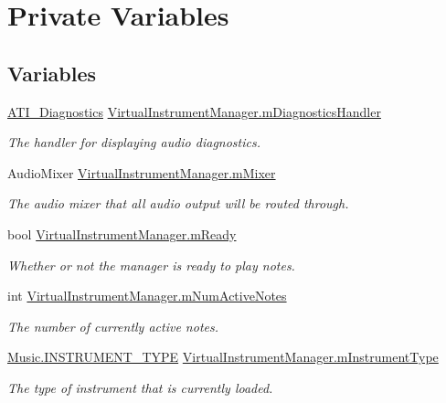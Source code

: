 \hypertarget{group___v_i_m_priv}{}\section{Private Variables}
\label{group___v_i_m_priv}
\subsection*{Variables}
\begin{DoxyCompactItemize}
\item 
\hyperlink{group___audio_testing_class_a_t_i___diagnostics}{A\+T\+I\+\_\+\+Diagnostics} \hyperlink{group___v_i_m_priv_gafabe4a874fc21f7bcedf431df3b94201}{Virtual\+Instrument\+Manager.\+m\+Diagnostics\+Handler}
\begin{DoxyCompactList}\small\item\em The handler for displaying audio diagnostics. \end{DoxyCompactList}\item 
Audio\+Mixer \hyperlink{group___v_i_m_priv_ga08c8db1bb89f4ab1e28451dd93d6b99c}{Virtual\+Instrument\+Manager.\+m\+Mixer}
\begin{DoxyCompactList}\small\item\em The audio mixer that all audio output will be routed through. \end{DoxyCompactList}\item 
bool \hyperlink{group___v_i_m_priv_ga983a11920bf16794735cc193c327ac42}{Virtual\+Instrument\+Manager.\+m\+Ready}
\begin{DoxyCompactList}\small\item\em Whether or not the manager is ready to play notes. \end{DoxyCompactList}\item 
int \hyperlink{group___v_i_m_priv_ga0f7e11945763c48057be326b661dfdaf}{Virtual\+Instrument\+Manager.\+m\+Num\+Active\+Notes}
\begin{DoxyCompactList}\small\item\em The number of currently active notes. \end{DoxyCompactList}\item 
\hyperlink{group___music_enums_gabfce60192305965558a36e368ebd67c3}{Music.\+I\+N\+S\+T\+R\+U\+M\+E\+N\+T\+\_\+\+T\+Y\+PE} \hyperlink{group___v_i_m_priv_ga108c350257b3a2080e06cd4a8251f6a4}{Virtual\+Instrument\+Manager.\+m\+Instrument\+Type}
\begin{DoxyCompactList}\small\item\em The type of instrument that is currently loaded. \end{DoxyCompactList}\item 

\end{DoxyCompactItemize}
